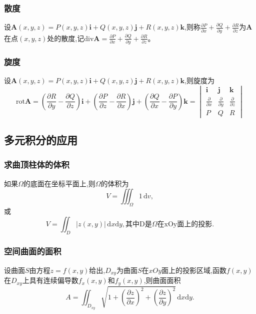 \documentclass[UTF8]{ctexart}
\theoremstyle{remark}
\begin{document}
	
	\subsubsection{散度}
	设\(\boldsymbol{A}(x,y,z) = P(x,y,z)\boldsymbol{i} + Q(x,y,z)\boldsymbol{j} + R(x,y,z)\boldsymbol{k}\),则称\(\frac{\partial P}{\partial x} + \frac{\partial Q}{\partial y} + \frac{\partial R}{\partial z}\)为\(\boldsymbol{A}\)在点\((x,y,z)\)处的散度,记\(\text{div} \boldsymbol{A} = \frac{\partial P}{\partial x} + \frac{\partial Q}{\partial y} + \frac{\partial R}{\partial z}\)。
	
	\subsubsection{旋度}
	设\(\boldsymbol{A}(x,y,z) = P(x,y,z)\boldsymbol{i} + Q(x,y,z)\boldsymbol{j} + R(x,y,z)\boldsymbol{k}\),则旋度为
	\[
	\text{rot} \boldsymbol{A} = \left( \frac{\partial R}{\partial y} - \frac{\partial Q}{\partial z} \right) \boldsymbol{i} + \left( \frac{\partial P}{\partial z} - \frac{\partial R}{\partial x} \right) \boldsymbol{j} + \left( \frac{\partial Q}{\partial x} - \frac{\partial P}{\partial y} \right) \boldsymbol{k} = 
	\begin{vmatrix}
		\boldsymbol{i} & \boldsymbol{j} & \boldsymbol{k} \\
		\frac{\partial}{\partial x} & \frac{\partial}{\partial y} & \frac{\partial}{\partial z} \\
		P & Q & R
	\end{vmatrix}
	\] 
	
	\subsection{多元积分的应用}
	\subsubsection{求曲顶柱体的体积}
	如果\(\Omega\)的底面在坐标平面上,则\(\Omega\)的体积为
	\[
	V = \iiint_{\Omega} 1 \, \mathrm{d}v,
	\]
	或
	\[
	V = \iint_{D} |z(x,y)| \, \mathrm{d}x\mathrm{d}y,\text{其中D是$\Omega$在xOy面上的投影.}
	\]
	
	\subsubsection{空间曲面的面积}
	设曲面\(S\)由方程\(z = f(x,y)\)给出,\(D_{xy}\)为曲面\(S\)在\(xOy\)面上的投影区域,函数\(f(x,y)\)在\(D_{xy}\)上具有连续偏导数\(f_x(x,y)\)和\(f_y(x,y)\),则曲面面积
	\[
	A = \iint_{D_{xy}} \sqrt{1 + \left(\frac{\partial z}{\partial x}\right)^2 + \left(\frac{\partial z}{\partial y}\right)^2} \, \mathrm{d}x\mathrm{d}y.
	\]
	
\end{document}
